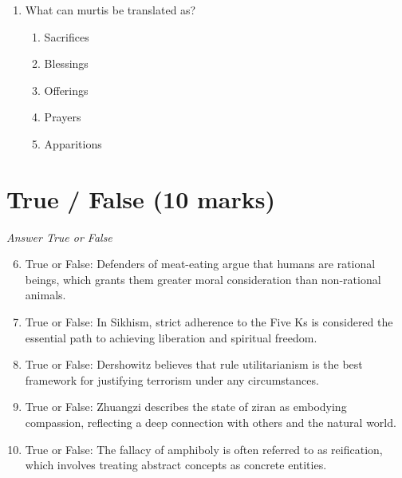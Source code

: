 \documentclass[12pt]{article}
\begin{document}
\begin{enumerate}[label=\arabic*.]
\begin{enumerate}[label=(\alph*)]
    \item preference.
    \item natural law.
    \item self-interest.
    \item maximizing utility.
    \item ethical relativism.
\end{enumerate}
\item What can murtis be translated as?
\begin{enumerate}[label=(\alph*)]
    \item Sacrifices
    \item Blessings
    \item Offerings
    \item Prayers
    \item Apparitions
\end{enumerate}
\end{enumerate}

\section*{True / False (10 marks)}
\textit{Answer True or False}
\begin{enumerate}[label=\arabic*.]
\setcounter{enumi}{5}
\item True or False: Defenders of meat-eating argue that humans are rational beings, which grants them greater moral consideration than non-rational animals.
\item True or False: In Sikhism, strict adherence to the Five Ks is considered the essential path to achieving liberation and spiritual freedom.
\item True or False: Dershowitz believes that rule utilitarianism is the best framework for justifying terrorism under any circumstances.
\item True or False: Zhuangzi describes the state of ziran as embodying compassion, reflecting a deep connection with others and the natural world.
\item True or False: The fallacy of amphiboly is often referred to as reification, which involves treating abstract concepts as concrete entities.
\end{enumerate}
\end{document}
